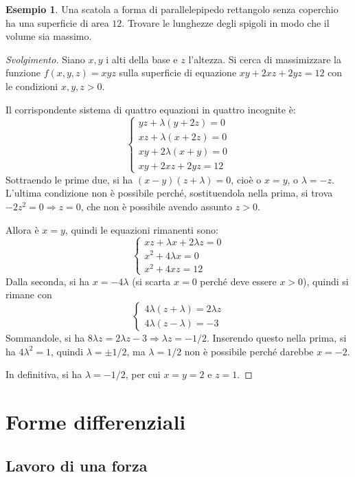 \documentclass[11pt, a4paper]{scrartcl}
\newenvironment{svolgimento}{\renewcommand\qedsymbol{$\blacksquare$}\begin{proof}[Svolgimento]}{\end{proof}}
\theoremstyle{definition}
\newtheorem{esempio}{Esempio}
\numberwithin{esempio}{section}
\theoremstyle{definition}
\numberwithin{obs}{section}
\numberwithin{nota}{section}
\numberwithin{equation}{subsection}
\begin{document}
\begin{esempio}
Una scatola a forma di parallelepipedo rettangolo senza coperchio ha una superficie di area $12$. 
Trovare le lunghezze degli spigoli in modo che il volume sia massimo.
\begin{svolgimento}
	Siano $x,y$ i alti della base e $z$ l'altezza. 
	Si cerca di massimizzare la funzione $f(x,y,z) = xyz$ sulla superficie di equazione $xy + 2xz + 2yz = 12$ con le condizioni $x,y,z>0$.

	Il corrispondente sistema di quattro equazioni in quattro incognite \`e:
	\[
	\begin{cases}
		yz + \lambda (y+2z) = 0 \\
		xz + \lambda (x+2z) = 0\\
		xy + 2\lambda (x+y) = 0\\
		xy + 2xz + 2yz = 12
	\end{cases}
	\] 
	Sottraendo le prime due, si ha $(x-y) (z+\lambda ) = 0$, cio\`e o $x=y$, o $\lambda = -z$. 
	L'ultima condizione non \`e possibile perch\'e, sostituendola nella prima, si trova $-2z^2 = 0 \Rightarrow z= 0$, che non \`e possibile avendo assunto $z>0$.

	Allora \`e $x=y$, quindi le equazioni rimanenti sono:
	\[
	\begin{cases}
		xz + \lambda x + 2 \lambda z=0\\
		x^2 + 4\lambda  x = 0\\
		x^2 + 4xz = 12
	\end{cases}
	\] 
	Dalla seconda, si ha $x=-4\lambda $ (si scarta $x=0$ perch\'e deve essere $x>0$), quindi si rimane con
	\[
	\begin{cases}
		4\lambda (z+\lambda ) = 2\lambda z \\
		4\lambda (z-\lambda ) = -3
	\end{cases}
	\] 
	Sommandole, si ha $8\lambda z = 2\lambda z -  3\Rightarrow \lambda  z = -1 / 2$.
	Inserendo questo nella prima, si ha $4\lambda ^2 = 1$, quindi $\lambda  = \pm 1/2$, ma $\lambda  = 1 / 2$ non \`e possibile perch\'e darebbe $x = -2$.

	In definitiva, si ha $\lambda  = - 1  / 2$, per cui $x=y=2$ e $z=1$.
\end{svolgimento}
\end{esempio}

\newpage
\section{Forme differenziali}
\subsection{Lavoro di una forza}
\end{document}
